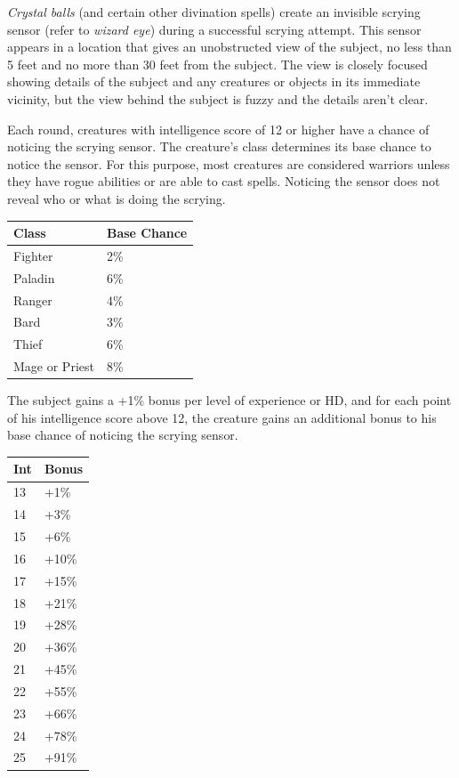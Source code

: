 \begin{multicols}{2}
\textit{Crystal balls} (and certain other divination spells) create an invisible scrying sensor (refer to \textit{wizard eye}) during a successful scrying attempt.  This sensor appears in a location that gives an unobstructed view of the subject, no less than 5 feet and no more than 30 feet from the subject.  The view is closely focused showing details of the subject and any creatures or objects in its immediate vicinity, but the view behind the subject is fuzzy and the details aren't clear.

Each round, creatures with intelligence score of 12 or higher have a chance of noticing the scrying sensor.  The creature's class determines its base chance to notice the sensor.  For this purpose, most creatures are considered warriors unless they have rogue abilities or are able to cast spells.  Noticing the sensor does not reveal who or what is doing the scrying.  

\noindent \begin{tabular}{|p{}|p{}|}
\hline
Class	& Base Chance \\
\hline\hline
\rowcolor[gray]{.9}Fighter	& 2\% \\
Paladin	& 6\% \\
\rowcolor[gray]{.9}Ranger	& 4\% \\
Bard	& 3\% \\
\rowcolor[gray]{.9}Thief	& 6\% \\
Mage or Priest	& 8\% \\
\hline
\end{tabular}

The subject gains a +1\% bonus per level of experience or HD, and for each point of his intelligence score above 12, the creature gains an additional bonus to his base chance of noticing the scrying sensor. 
 
\noindent \begin{tabular}{|p{}|p{}|}
\hline
Int	& Bonus \\
\hline\hline
\rowcolor[gray]{.9}13	& +1\% \\
14	& +3\% \\
\rowcolor[gray]{.9}15	& +6\% \\
16	& +10\% \\
\rowcolor[gray]{.9}17	& +15\% \\
18	& +21\% \\
\rowcolor[gray]{.9}19	& +28\% \\
20	& +36\% \\
\rowcolor[gray]{.9}21	& +45\% \\
22	& +55\% \\
\rowcolor[gray]{.9}23	& +66\% \\
24	& +78\% \\
\rowcolor[gray]{.9}25	& +91\% \\
\hline
\end{tabular}


\end{multicols}
